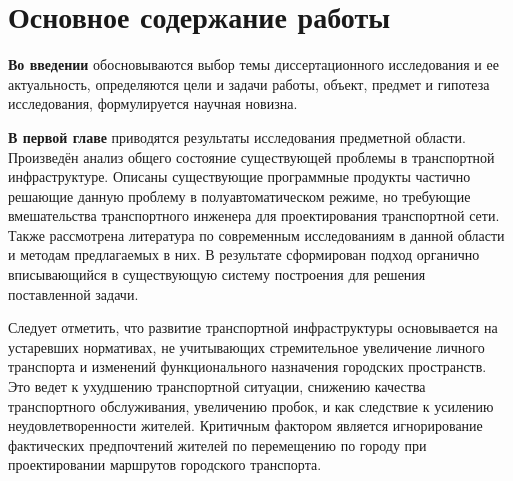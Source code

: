 

\section{Основное содержание работы}
\textbf{Во введении} обосновываются выбор темы диссертационного исследования и ее актуальность, определяются 
цели и задачи работы, объект, предмет и гипотеза исследования, формулируется научная новизна.

\textbf{В первой главе} приводятся результаты исследования предметной области. Произведён анализ общего 
состояние существующей проблемы в транспортной инфраструктуре. Описаны существующие программные продукты 
частично решающие данную проблему в полуавтоматическом режиме, но требующие вмешательства транспортного 
инженера для проектирования транспортной сети. Также рассмотрена литература по современным исследованиям в 
данной области и методам предлагаемых в них. В результате сформирован подход органично вписывающийся в 
существующую систему построения для решения поставленной задачи.

Следует отметить, что развитие транспортной инфраструктуры основывается на устаревших нормативах, не 
учитывающих стремительное увеличение личного транспорта и изменений функционального назначения городских 
пространств. Это ведет к ухудшению транспортной ситуации, снижению качества транспортного обслуживания, 
увеличению пробок, и как следствие к усилению неудовлетворенности жителей. Критичным фактором является 
игнорирование фактических предпочтений жителей по перемещению по городу при проектировании маршрутов 
городского транспорта.

